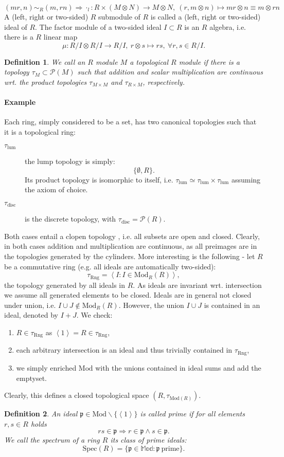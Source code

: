 \documentclass[10pt,a4paper]{article}
\newtheorem{defi}{Definition}
\newcommand{\tauRng}{\tau_{\mathrm{Rng}}}
\newcommand{\bn}{\begin{enumerate}}
\newcommand{\en}{\end{enumerate}}
\begin{document}
$$(m r, n) \sim_R (m, r n) \Rightarrow \cdot_l : R \times (M \otimes N) \longrightarrow M \otimes N,\ (r, m \otimes n) \longmapsto m r \otimes n \equiv m \otimes r n$$
A (left, right or two-sided) $R$ submodule of $R$ is called a (left, right or two-sided) ideal of $R$. The factor module of a two-sided ideal $I \subset R$ is an $R$ algebra, i.e. there is a $R$ linear map
$$\mu : R/I \otimes R/I \longrightarrow R/I,\ r \otimes s \longmapsto r s,\ \forall r, s \in R/I.$$
\begin{defi}
We call an $R$ module $M$ a topological $R$ module if there is a topology $\tau_M \subset \mathcal{P}(M)$ such that addition and scalar multiplication are continuous wrt. the product topologies $\tau_{M \times M}$ and $\tau_{R \times M}$, respectively.
\end{defi}
\paragraph{Example}
Each ring, simply considered to be a set, has two canonical topologies such that it is a topological ring:
\begin{description}
\item[$\tau_{\mathrm{lum}}$] the lump topology is simply:
$$\{\emptyset, R\}.$$
Its product topology is isomorphic to itself, i.e. $\tau_{\mathrm{lum}} \simeq \tau_{\mathrm{lum}} \times \tau_{\mathrm{lum}}$ assuming the axiom of choice. 
\item[$\tau_{\mathrm{disc}}$] is the discrete topology, with $\tau_{\mathrm{disc}} = \mathcal{P}(R)$.
\end{description}
Both cases entail a clopen topology , i.e. all subsets are open and closed. Clearly, in both cases addition and multiplication are continuous, as all preimages are in the topologies generated by the cylinders. More interesting is the following - let $R$ be a commutative ring (e.g. all ideals are automatically two-sided):
$$\tauRng = \left<I : I \in \mathrm{Mod}_R(R)\right>,$$
the topology generated by all ideals in $R$. As ideals are invariant wrt. intersection we assume all generated elements to be closed. Ideals are in general not closed under union, i.e. $I \cup J \notin \mathrm{Mod}_R(R)$. However, the union $I \cup J$ is contained in an ideal, denoted by $I + J$. We check:
\bn
\item $R \in \tauRng$ as $\left<1\right> = R \in \tauRng$,
\item each arbitrary intersection is an ideal and thus trivially contained in $\tauRng$,
\item we simply enriched $\mathrm{Mod}$ with the unions contained in ideal sums and add the emptyset.
\en
Clearly, this defines a closed topological space $(R, \tau_{\mathrm{Mod}(R)})$.
\begin{defi}
An ideal $\mathfrak{p} \in \mathrm{Mod} \backslash \{\left<1\right>\}$ is called prime if for all elements $r, s \in R$ holds
$$r s \in \mathfrak{p} \Rightarrow r \in \mathfrak{p} \wedge s \in \mathfrak{p}.$$
We call the spectrum of a ring $R$ its class of prime ideals:
$$\mathrm{Spec}(R) = \{\mathfrak{p} \in \mathbb{Mod} : \mathfrak{p}\ \mathrm{prime}\}.$$
\end{defi}
\end{document}
